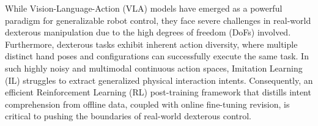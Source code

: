\documentclass{article}
\begin{document}
While Vision-Language-Action (VLA) models have emerged as a powerful paradigm for generalizable robot control, they face severe challenges in real-world dexterous manipulation due to the high degrees of freedom (DoFs) involved. Furthermore, dexterous tasks exhibit inherent action diversity, where multiple distinct hand poses and configurations can successfully execute the same task. In such highly noisy and multimodal continuous action spaces, Imitation Learning (IL) struggles to extract generalized physical interaction intents. Consequently, an efficient Reinforcement Learning (RL) post-training framework that distills intent comprehension from offline data, coupled with online fine-tuning revision, is critical to pushing the boundaries of real-world dexterous control.

\end{document}
